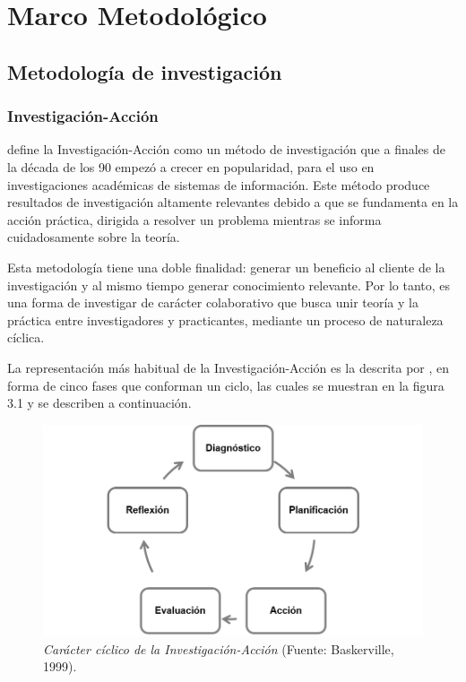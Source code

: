 \chapter{ Marco Metodol\'{o}gico}
	
	\section{Metodolog\'{i}a de investigaci\'{o}n}
	
		\subsection{Investigaci\'{o}n-Acci\'{o}n}
	\cite{Baskerville} define la Investigaci\'{o}n-Acci\'{o}n como un m\'{e}todo de investigaci\'{o}n que a finales de la d\'{e}cada de los 90 empez\'{o} a crecer en popularidad, para el uso en investigaciones acad\'{e}micas de sistemas de informaci\'{o}n. Este m\'{e}todo produce resultados de investigaci\'{o}n altamente relevantes debido a que se fundamenta en la acci\'{o}n pr\'{a}ctica, dirigida a resolver un problema mientras se informa cuidadosamente sobre la teor\'{i}a.

	Esta metodolog\'{i}a tiene una doble finalidad: generar un beneficio al cliente de la investigaci\'{o}n y al mismo tiempo generar conocimiento relevante. Por lo tanto, es una forma de investigar de car\'{a}cter colaborativo que busca unir teor\'{i}a y la pr\'{a}ctica entre investigadores y practicantes, mediante un proceso de naturaleza c\'{i}clica.

	La representaci\'{o}n m\'{a}s habitual de la Investigaci\'{o}n-Acci\'{o}n es la descrita por \cite{Baskerville}, en forma de cinco fases que conforman un ciclo, las cuales se muestran en la figura 3.1 y se describen a continuaci\'{o}n.

	\begin{figure}
		\centering
		\includegraphics[scale=0.8]{img/investigacion-accion.png}
			\caption[Car\'{a}cter c\'{i}clico de la Investigaci\'{o}n-Acci\'{o}n]{\textit{Car\'{a}cter c\'{i}clico de la Investigaci\'{o}n-Acci\'{o}n} (Fuente: Baskerville, 1999).}
	\end{figure}


